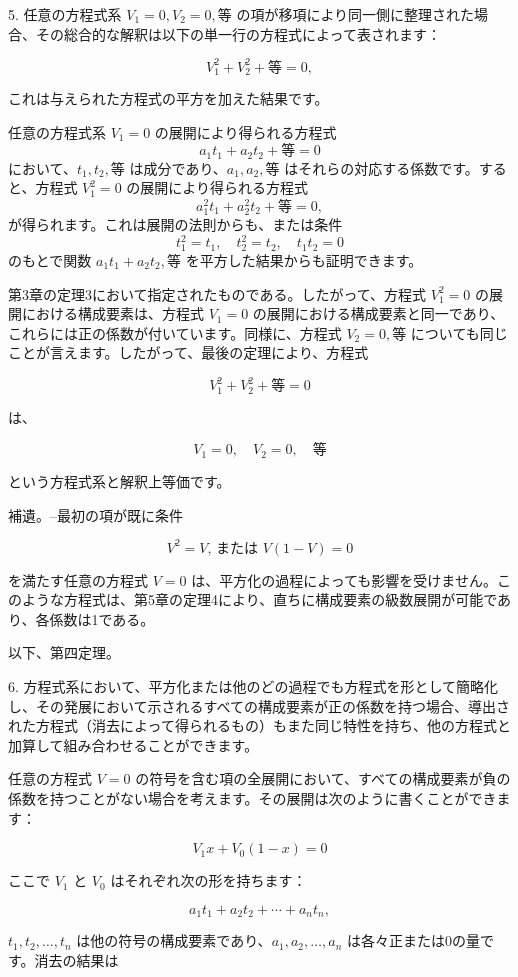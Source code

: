 \documentclass[a4paper,11pt,openany]{ltjsbook}
\begin{document}
5. 任意の方程式系 $V_1=0, V_2=0, 等$ の項が移項により同一側に整理された場合、その総合的な解釈は以下の単一行の方程式によって表されます：

\[
V_{1}^2 + V_{2}^2 + 等 = 0,
\]

これは与えられた方程式の平方を加えた結果です。

任意の方程式系 $V_1=0$ の展開により得られる方程式
\[
a_1 t_1 + a_2 t_2 + 等 = 0
\]
において、$t_1, t_2, 等$ は成分であり、$a_1, a_2, 等$ はそれらの対応する係数です。すると、方程式 $V_{1}^2=0$ の展開により得られる方程式
\[
a_{1}^2 t_1 + a_{2}^2 t_2 + 等 = 0,
\]
が得られます。これは展開の法則からも、または条件
\[
t_{1}^2=t_1, \quad t_{2}^2=t_2, \quad t_1 t_2=0
\]
のもとで関数 $a_1 t_1 + a_2 t_2, 等$ を平方した結果からも証明できます。

第3章の定理3において指定されたものである。したがって、方程式 $V_{1}^2=0$ の展開における構成要素は、方程式 $V_1=0$ の展開における構成要素と同一であり、これらには正の係数が付いています。同様に、方程式 $V_2=0, 等$ についても同じことが言えます。したがって、最後の定理により、方程式

\[
V_{1}^2 + V_{2}^2 + 等 = 0
\]

は、

\[
V_1=0, \quad V_2=0, \quad 等
\]

という方程式系と解釈上等価です。

補遺。--最初の項が既に条件

\[
V^2=V \textrm{, または } V(1-V)=0
\]

を満たす任意の方程式 $V=0$ は、平方化の過程によっても影響を受けません。このような方程式は、第5章の定理4により、直ちに構成要素の級数展開が可能であり、各係数は1である。

以下、第四定理。

6. 方程式系において、平方化または他のどの過程でも方程式を形として簡略化し、その発展において示されるすべての構成要素が正の係数を持つ場合、導出された方程式（消去によって得られるもの）もまた同じ特性を持ち、他の方程式と加算して組み合わせることができます。

任意の方程式 $V = 0$ の符号を含む項の全展開において、すべての構成要素が負の係数を持つことがない場合を考えます。その展開は次のように書くことができます：

\[
V_{1} x + V_{0}(1-x) = 0
\]

ここで $V_{1}$ と $V_{0}$ はそれぞれ次の形を持ちます：

\[
a_{1}t_{1} + a_{2}t_{2} + \cdots + a_{n}t_{n},
\]

$t_{1}, t_{2}, \ldots, t_{n}$ は他の符号の構成要素であり、$a_{1}, a_{2}, \ldots, a_{n}$ は各々正または0の量です。消去の結果は
\end{document}
